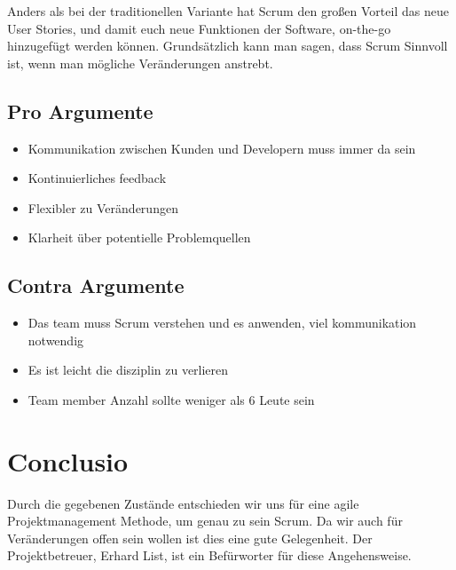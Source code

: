 Anders als bei der traditionellen Variante hat Scrum den großen Vorteil das neue User Stories, und damit euch neue Funktionen der Software, on-the-go hinzugefügt werden können. Grundsätzlich kann man sagen, dass Scrum Sinnvoll ist, wenn man mögliche Veränderungen anstrebt.

\newpage
\subsection{Pro Argumente}
\begin{itemize}
		\item Kommunikation zwischen Kunden und Developern muss immer da sein
		\item Kontinuierliches feedback
		\item Flexibler zu Veränderungen
		\item Klarheit über potentielle Problemquellen
\end{itemize}

\subsection{Contra Argumente}
\begin{itemize}
		\item Das team muss Scrum verstehen und es anwenden, viel kommunikation notwendig
		\item Es ist leicht die disziplin zu verlieren
		\item Team member Anzahl sollte weniger als 6 Leute sein
\end{itemize}


\section{Conclusio}
Durch die gegebenen Zustände entschieden wir uns für eine agile Projektmanagement Methode, um genau zu sein Scrum. Da wir auch für Veränderungen offen sein wollen ist dies eine gute Gelegenheit. Der Projektbetreuer, Erhard List, ist ein Befürworter für diese Angehensweise. 
